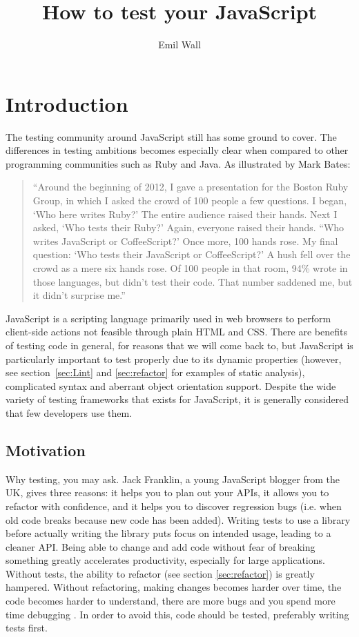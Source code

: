 \documentclass[11pt]{article}
\title{How to test your JavaScript}
\author{Emil Wall}
\begin{document}
%
\tableofcontents %

\section{Introduction}

The testing community around JavaScript still has some ground to cover. The differences in testing ambitions becomes especially clear when compared to other programming communities such as Ruby and Java. As illustrated by Mark Bates\cite{TestingStatistics}:

\begin{quote}
``Around the beginning of 2012, I gave a presentation for the Boston Ruby Group, in which I asked the crowd of 100 people a few questions. I began, `Who here writes Ruby?' The entire audience raised their hands. Next I asked, `Who tests their Ruby?' Again, everyone raised their hands. ``Who writes JavaScript or CoffeeScript?' Once more, 100 hands rose. My final question: `Who tests their JavaScript or CoffeeScript?' A hush fell over the crowd as a mere six hands rose. Of 100 people in that room, 94\% wrote in those languages, but didn't test their code. That number saddened me, but it didn't surprise me.''
\end{quote}

JavaScript is a scripting language primarily used in web browsers to perform client-side actions not feasible through plain HTML and CSS. There are benefits of testing code in general, for reasons that we will come back to, but JavaScript is particularly important to test properly due to its dynamic properties (however, see section~\ref{sec:Lint} and \ref{sec:refactor} for examples of static analysis), complicated syntax \cite[questions~1-3]{Stenmark} and aberrant object orientation support. Despite the wide variety of testing frameworks that exists for JavaScript, it is generally considered that few developers use them.

\subsection{Motivation}
\label{sec:motivation}

Why testing, you may ask. Jack Franklin, a young JavaScript blogger from the UK, gives three reasons: it helps you to plan out your APIs, it allows you to refactor with confidence, and it helps you to discover regression bugs (i.e. when old code breaks because new code has been added). Writing tests to use a library before actually writing the library puts focus on intended usage, leading to a cleaner API. Being able to change and add code without fear of breaking something greatly accelerates productivity, especially for large applications. \cite{JackFranklin} Without tests, the ability to refactor (see section \ref{sec:refactor}) is greatly hampered. Without refactoring, making changes becomes harder over time, the code becomes harder to understand, there are more bugs and you spend more time debugging \cite[p.~47-49]{Refactoring}. In order to avoid this, code should be tested, preferably writing tests first.
\end{document}
